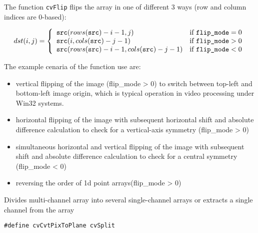 \begin{description}
\end{description}

The function \texttt{cvFlip} flips the array in one of different 3 ways (row and column indices are 0-based):

\[
dst(i,j) = \left\{ \begin{array}{l l} \texttt{src}(rows(\texttt{src})-i-1,j) & \mbox{if $\texttt{flip\_mode} = 0$}\\ \texttt{src}(i,cols(\texttt{src})-j-1) & \mbox{if $\texttt{flip\_mode} > 0$}\\ \texttt{src}(rows(\texttt{src})-i-1,cols(\texttt{src})-j-1) & \mbox{if $\texttt{flip\_mode} < 0$}\\ \end{array} \right.
\]

The example cenaria of the function use are:
\begin{itemize}
  \item vertical flipping of the image (flip\_mode > 0) to switch between top-left and bottom-left image origin, which is typical operation in video processing under Win32 systems.
  \item horizontal flipping of the image with subsequent horizontal shift and absolute difference calculation to check for a vertical-axis symmetry (flip\_mode > 0)
  \item simultaneous horizontal and vertical flipping of the image with subsequent shift and absolute difference calculation to check for a central symmetry (flip\_mode < 0)
  \item reversing the order of 1d point arrays(flip\_mode > 0)
\end{itemize}


Divides multi-channel array into several single-channel arrays or extracts a single channel from the array


\begin{lstlisting}
#define cvCvtPixToPlane cvSplit
\end{lstlisting}

\begin{description}
\end{description}

